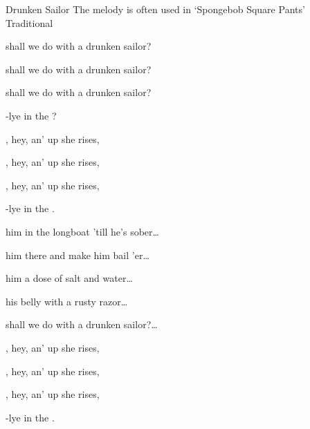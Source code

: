 \begin{SBSong}{Drunken Sailor}
  {The melody is often used in `Spongebob Square Pants'}
  {Traditional}
  \begin{SBVerse}
     shall we do with a drunken sailor? 

     shall we do with a drunken sailor? 

     shall we do with a drunken sailor? 

    -lye in the ? 
  \end{SBVerse}
  \begin{SBChorus}
    , hey, an' up she rises, 
    
    , hey, an' up she rises, 

    , hey, an' up she rises, 

    -lye in the . 
    
  \end{SBChorus}
  \begin{SBVerse}
     him in the longboat 'till he's sober\ldots 
  \end{SBVerse}
  \begin{SBVerse}
     him there and make him bail 'er\ldots 
  \end{SBVerse}
  \begin{SBVerse}
     him a dose of salt and water\ldots 
  \end{SBVerse}
  \begin{SBVerse}
     his belly with a rusty razor\ldots 
  \end{SBVerse}
  \begin{SBVerse}
     shall we do with a drunken sailor?\ldots 
  \end{SBVerse}
  \ifChordBk
  \begin{SBChorus}
    , hey, an' up she rises, 
    
    , hey, an' up she rises, 

    , hey, an' up she rises, 

    -lye in the .  
  \end{SBChorus}
  \fi
\end{SBSong}